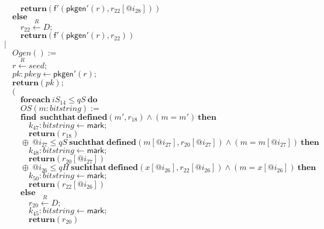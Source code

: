 \documentclass{article}
\newcommand{\store}{\leftarrow}
\newcommand{\getR}{\stackrel{R}{\store}}
\newcommand{\kw}[1]{\mathbf{#1}}
\newcommand{\kwf}[1]{\mathsf{#1}}
\newcommand{\var}[1]{\mathit{#1}}
\newcommand{\kwt}[1]{\mathit{#1}}
\newcommand{\kwp}[1]{\mathit{#1}}
\begin{document}
\begin{tabbing}
$\quad \quad \kw{return}\kwf{}(\kwf{f'}(\kwf{pkgen'}(\var{r}), \var{r}_{22}[\var{@i}_{28}]))$\\
$\quad \kw{else}$\\
$\quad \quad \var{r}_{22} \getR \kwt{D};$\\
$\quad \quad \kw{return}\kwf{}(\kwf{f'}(\kwf{pkgen'}(\var{r}), \var{r}_{22}))$\\
$|$\\
$\quad Ogen() :=$\\
$\quad \var{r} \getR \kwt{seed};$\\
$\quad \var{pk}: \kwt{pkey} \store \kwf{pkgen'}(\var{r});$\\
$\quad \kw{return}\kwf{}(\var{pk});$\\
$\quad ($\\
$\quad \quad \kw{foreach}\ \var{iS}_{14} \leq \kwp{qS}\ \kw{do}$\\
$\quad \quad OS(\var{m}: \kwt{bitstring}) :=$\\
$\quad \quad \kw{find}\ \ \kw{suchthat}\ \kw{defined}(\var{m'}, \var{r}_{18})\wedge (\var{m}  =  \var{m'})\ \kw{then}$\\
$\quad \quad \quad \var{k}_{47}: \kwt{bitstring} \store \kwf{mark};$\\
$\quad \quad \quad \kw{return}\kwf{}(\var{r}_{18})$\\
$\quad \quad \oplus\ \var{@i}_{27} \leq \kwp{qS}\ \kw{suchthat}\ \kw{defined}(\var{m}[\var{@i}_{27}], \var{r}_{20}[\var{@i}_{27}])\wedge (\var{m}  =  \var{m}[\var{@i}_{27}])\ \kw{then}$\\
$\quad \quad \quad \var{k}_{48}: \kwt{bitstring} \store \kwf{mark};$\\
$\quad \quad \quad \kw{return}\kwf{}(\var{r}_{20}[\var{@i}_{27}])$\\
$\quad \quad \oplus\ \var{@i}_{26} \leq \kwp{qH}\ \kw{suchthat}\ \kw{defined}(\var{x}[\var{@i}_{26}], \var{r}_{22}[\var{@i}_{26}])\wedge (\var{m}  =  \var{x}[\var{@i}_{26}])\ \kw{then}$\\
$\quad \quad \quad \var{k}_{50}: \kwt{bitstring} \store \kwf{mark};$\\
$\quad \quad \quad \kw{return}\kwf{}(\var{r}_{22}[\var{@i}_{26}])$\\
$\quad \quad \kw{else}$\\
$\quad \quad \quad \var{r}_{20} \getR \kwt{D};$\\
$\quad \quad \quad \var{k}_{45}: \kwt{bitstring} \store \kwf{mark};$\\
$\quad \quad \quad \kw{return}\kwf{}(\var{r}_{20})$\\

\end{tabbing}
\end{document}
